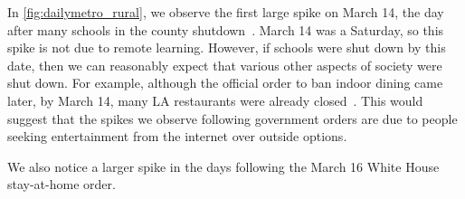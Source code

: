 In \cref{fig:dailymetro_rural}, we observe the first large spike on March 14, the day after many schools in the county shutdown~\cite{haire2020LA}. March 14 was a Saturday, so this spike is not due to remote learning. However, if schools were shut down by this date, then we can reasonably expect that various other aspects of society were shut down. For example, although the official order to ban indoor dining came later, by March 14, many \gls{LA} restaurants were already closed~\cite{eater2020}. This would suggest that the spikes we observe following government orders are due to people seeking entertainment from the internet over outside options.

We also notice a larger spike in the days following the March 16 White House stay-at-home order.